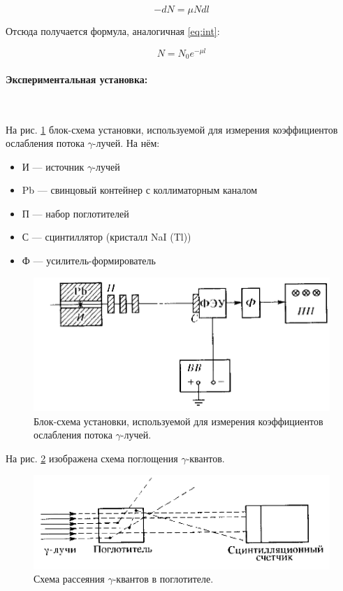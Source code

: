 \documentclass[a4paper, 12pt]{article}
\newcommand{\parag}[1]{\paragraph*{#1:}}
\begin{document}
\[
    -dN = \mu N dl
\]

Отсюда получается формула, аналогичная \eqref{eq:int}:

\begin{equation}
    N = N_0 e^{-\mu l}
    \label{eq:num}
\end{equation}

\parag {Экспериментальная установка} ~

На рис. \ref{pic:work1} блок-схема установки, используемой для измерения коэффициентов ослабления потока $\gamma$-лучей. На нём:

\begin{itemize}
    \item И --- источник $\gamma$-лучей
    \item Pb --- свинцовый контейнер с коллиматорным каналом
    \item П --- набор поглотителей
    \item С --- сцинтиллятор (кристалл NaI (Tl))
    \item Ф --- усилитель-формирователь
\end{itemize}

\begin{figure}[!h]
    \includegraphics[scale = 0.4]{Workplace1}
    \centering
    \caption{Блок-схема установки, используемой для измерения коэффициентов ослабления потока $\gamma$-лучей.}
    \label{pic:work1}
\end{figure}

На рис. \ref{pic:work2} изображена схема поглощения $\gamma$-квантов.

\begin{figure}[!h]
    \includegraphics[scale = 0.4]{Workplace2}
    \centering
    \caption{Схема рассеяния $\gamma$-квантов в поглотителе.}
    \label{pic:work2}
\end{figure}
\end{document}
